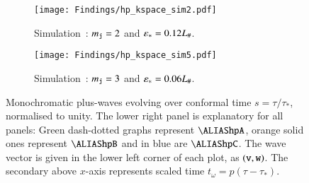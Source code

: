     \begin{figure}[ht!]\ContinuedFloat
        \begin{subfigure}[b]{\linewidth}
            \texttt{[image: Findings/hp\_kspace\_sim2.pdf]}
        \caption{Simulation~: $m_{\mathtt{j}}=2$ and $\varepsilon_\ast=0.12L_\#$.}
        \label{fig:results:h11:hp_kspace_sim2}
        \end{subfigure}
        \hfill
        \begin{subfigure}[b]{\linewidth}
            \texttt{[image: Findings/hp\_kspace\_sim5.pdf]}
        \caption{Simulation~: $m_{\mathtt{j}}=3$ and $\varepsilon_\ast=0.06L_\#$.}
        \label{fig:results:h11:hp_kspace_sim5}
        \end{subfigure}
        \caption{Monochromatic plus-waves evolving over conformal time $s=\tau/\tau_\ast$, normalised to unity. The lower right panel is explanatory for all panels: Green dash-dotted graphs represent $\hpA$, orange solid ones represent $\hpB$ and in blue are $\hpC$. The wave vector is given in the lower left corner of each plot, as $(\mathtt{v},\mathtt{w})$. The secondary above $x$-axis represents scaled time $t_\omega =p (\tau-\tau_\ast)$.}
        \label{fig:results:h11:hp_kspace}
    \end{figure}

